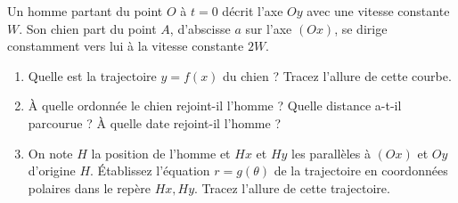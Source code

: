 %
\begin{exercice}
  Un homme partant du point $O$ à $t=0$ décrit l'axe $Oy$ avec une vitesse constante $W$. Son chien part du point $A$, d'abscisse $a$ sur l'axe $(Ox)$, se dirige constamment vers lui à la vitesse constante $2W$.
  \begin{enumerate}
  \item Quelle est la trajectoire $y=f(x)$ du chien ? Tracez l'allure de cette courbe.
  \item À quelle ordonnée le chien rejoint-il l'homme ? Quelle distance a-t-il parcourue ? À quelle date rejoint-il l'homme ?
  \item On note $H$ la position de l'homme et $Hx$ et $Hy$ les parallèles à $(Ox)$ et $Oy$ d'origine $H$. Établissez l'équation $r=g(\theta)$ de la trajectoire en coordonnées polaires dans le repère $Hx,Hy$. Tracez l'allure de cette trajectoire.
  \end{enumerate}
\end{exercice}